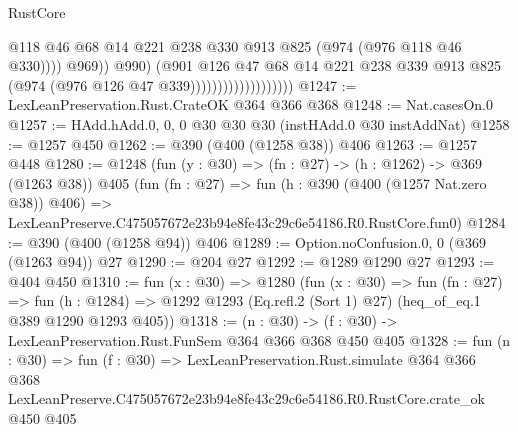 \begin{lexlean}{RustCore}
\begin{coremodule}
                                              @118
                                              @46
                                              @68
                                              @14
                                              @221
                                              @238
                                              @330
                                              @913
                                              @825
                                              (@974 (@976 @118 @46 @330))))
                                          @969))
                                      @990)
                                    (@901
                                      @126
                                      @47
                                      @68
                                      @14
                                      @221
                                      @238
                                      @339
                                      @913
                                      @825
                                      (@974 (@976 @126 @47 @339)))))))))))))))))))
@1247 := LexLeanPreservation.Rust.CrateOK @364 @366 @368
@1248 := Nat.casesOn.{0}
@1257 := HAdd.hAdd.{0, 0, 0} @30 @30 @30 (instHAdd.{0} @30 instAddNat)
@1258 := @1257 @450
@1262 := @390 (@400 (@1258 @38)) @406
@1263 := @1257 @448
@1280 := @1248
    (fun (y : @30) => (fn : @27) -> (h : @1262) -> @369 (@1263 @38))
    @405
    (fun (fn : @27) =>
    fun (h : @390 (@400 (@1257 Nat.zero @38)) @406) =>
    LexLeanPreserve.C475057672e23b94e8fe43c29c6e54186.R0.RustCore.fun0)
@1284 := @390 (@400 (@1258 @94)) @406
@1289 := Option.noConfusion.{0, 0} (@369 (@1263 @94)) @27
@1290 := @204 @27
@1292 := @1289 @1290 @27
@1293 := @404 @450
@1310 := fun (x : @30) =>
  @1280
    (fun (x : @30) =>
    fun (fn : @27) =>
    fun (h : @1284) => @1292 @1293 (Eq.refl.{2} (Sort 1) @27) (heq_of_eq.{1} @389 @1290 @1293 @405))
@1318 := (n : @30) -> (f : @30) -> LexLeanPreservation.Rust.FunSem @364 @366 @368 @450 @405
@1328 := fun (n : @30) =>
  fun (f : @30) =>
  LexLeanPreservation.Rust.simulate
    @364
    @366
    @368
    LexLeanPreserve.C475057672e23b94e8fe43c29c6e54186.R0.RustCore.crate_ok
    @450
    @405
\end{coremodule}
\end{lexlean}
